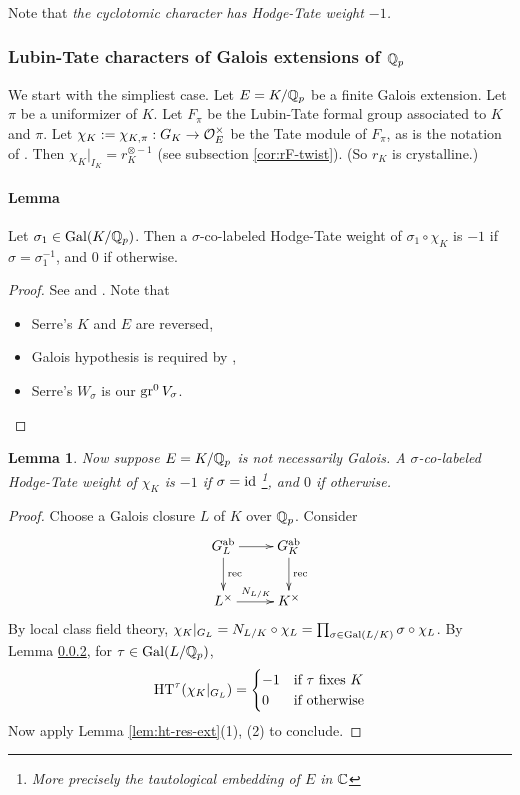 \documentclass[10pt,a4paper,twoside]{article}
\newtheorem{lem}{Lemma}
\begin{document}
\begin{appendix}
\subsubsection{}
Note that \textit{the cyclotomic character has Hodge-Tate weight $-1$.}


\subsubsection{Lubin-Tate characters of Galois extensions of $\mathbb{Q}_p$}
\label{lem:LT-galois}
We start with the simpliest case.
Let $E=K/\mathbb{Q}_p$ be a finite Galois extension.
Let $\pi$ be a uniformizer of $K$.
Let $F_\pi$ be the Lubin-Tate formal group associated to $K$ and $\pi$.
Let $\chi_K:= \chi_{K, \pi}:G_K \to \mathcal{O}_E^{\times}$ be the Tate module of $F_\pi$, as is the notation of \cite{Se89}.
Then $\chi_K|_{I_K} = r_K^{\otimes -1}$ (see subsection \ref{cor:rF-twist}).
(So $r_K$ is crystalline.)


\paragraph{\bf Lemma}

Let $\sigma_1\in\operatorname{Gal}(K/\mathbb{Q}_p)$.
Then a $\sigma$-co-labeled Hodge-Tate weight
of $\sigma_1\circ \chi_K$ is $-1$ if $\sigma=\sigma_1^{-1}$, and $0$ if otherwise.

\begin{proof}
See \cite[Thm 2, III.A.5]{Se89}
and \cite[Prop III.A.4]{Se89}.
Note that
\begin{itemize}
\item Serre's $K$ and $E$ are reversed,
\item Galois hypothesis is required by \cite[III.A.3(b)]{Se89},
\item Serre's $W_{\sigma}$ is our $\operatorname{gr}^0V_{\sigma}$.
\end{itemize}
\end{proof}


\begin{lem}
\label{lem:HT-LT}
Now suppose $E=K/\mathbb{Q}_p$ is not necessarily Galois.
A $\sigma$-co-labeled Hodge-Tate weight of
$\chi_K$ is $-1$ if $\sigma=\operatorname{id}$ 
\footnote{More precisely the tautological embedding of $E$ in ${\mathbb{C}}$}, and $0$ if otherwise.
\end{lem}

\begin{proof}
Choose a Galois closure $L$ of $K$ over $\mathbb{Q}_p$. Consider
$$
\xymatrix{
    G_L^{\ab} \ar[d]^{\operatorname{rec}} \ar[r] &
    G_K^{\ab} \ar[d]^{\operatorname{rec}} \\
    L^{\times} \ar[r]^{N_{L/K}} & K^{\times}
}
$$
By local class field theory,
$\chi_K|_{G_L}=N_{L/K}\circ \chi_L
=\prod_{\sigma\in \operatorname{Gal}(L/K)}\sigma\circ \chi_L$.
By Lemma \ref{lem:LT-galois},
for $\tau\in \operatorname{Gal}(L/\mathbb{Q}_p)$,
$$
{\operatorname{HT}}^{\tau}(\chi_K|_{G_L})=
\begin{cases}
-1 & \text{if $\tau$ fixes $K$} \\
0 & \text{if otherwise}
\end{cases}
$$
Now apply Lemma \ref{lem:ht-res-ext}(1), (2) to conclude.
\end{proof}



\end{appendix}
\end{document}

